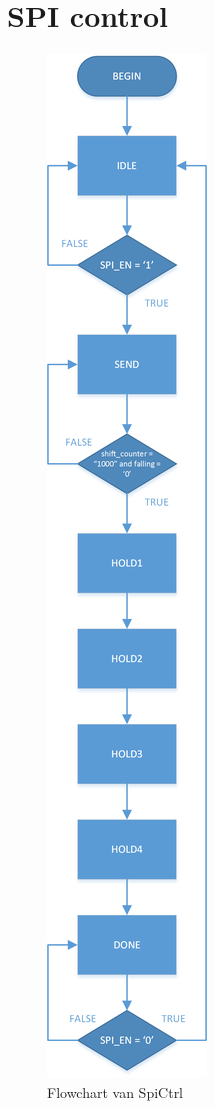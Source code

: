 \section{SPI control}
\label{sec:appSpiCtrl}
	\begin{figure}[H]
		\centering
		\includegraphics[height=0.85\textheight]{Appendix/FlowCharts/SpiCtrl}
		\caption{Flowchart van SpiCtrl}
		\label{fig:FlowChartSpiCtrl}
	\end{figure}

